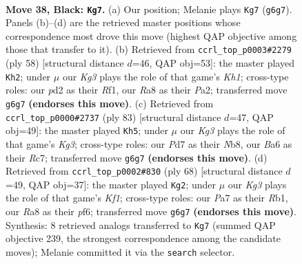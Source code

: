 \documentclass[11pt]{article}
\begin{document}
\clearpage

\begin{figure}[p]\centering
\begin{subfigure}{0.46\textwidth}\centering
\resizebox{\linewidth}{!}{%
\newchessgame
\chessboard[
  setfen={r7/p2p4/bppn2k1/5p1p/BPP2P2/N7/P2P3P/2R1K3 b - - 1 38},
  showmover=false,
  pgfstyle=straightmove, color=movearrow, markmove={g6-g7}
]}
\caption{}
\end{subfigure}\hfill
\begin{subfigure}{0.46\textwidth}\centering
\resizebox{\linewidth}{!}{%
\newchessgame
\chessboard[
  setfen={r5k1/ppp5/3pN1pp/3Pn3/2P1B2b/7P/PP4P1/5R1K w - - 3 30},
  showmover=false,
  pgfstyle=straightmove, color=movearrow, markmove={h1-h2}
]}
\caption{}
\end{subfigure}
\\[4pt]
\begin{subfigure}{0.46\textwidth}\centering
\resizebox{\linewidth}{!}{%
\newchessgame
\chessboard[
  setfen={1n6/1pr5/p3pbkp/P1P2p2/1N3P2/1R2B3/1P2K1P1/8 b - - 2 42},
  showmover=false,
  pgfstyle=straightmove, color=movearrow, markmove={g6-h5}
]}
\caption{}
\end{subfigure}\hfill
\begin{subfigure}{0.46\textwidth}\centering
\resizebox{\linewidth}{!}{%
\newchessgame
\chessboard[
  setfen={3r2k1/6p1/p4pp1/Pp6/1bn2B1P/1N4P1/1P2PP2/1R3K2 w - - 0 35},
  showmover=false,
  pgfstyle=straightmove, color=movearrow, markmove={f1-g2}
]}
\caption{}
\end{subfigure}
\caption{\textbf{Move 38, Black: \texttt{Kg7}.} (a) Our position; Melanie plays \texttt{Kg7} (\texttt{g6g7}). Panels (b)--(d) are the retrieved master positions whose correspondence most drove this move (highest QAP objective among those that transfer to it). (b) Retrieved from \texttt{ccrl\_top\_p0003\#2279} (ply 58) [structural distance $d$=46, QAP obj=53]: the master played \texttt{Kh2}; under $\mu$ our \emph{Kg3} plays the role of that game's \emph{Kh1}; cross-type roles: our \emph{p}d2 as their \emph{R}f1, our \emph{R}a8 as their \emph{P}a2; transferred move \texttt{g6g7} \textbf{(endorses this move)}. (c) Retrieved from \texttt{ccrl\_top\_p0000\#2737} (ply 83) [structural distance $d$=47, QAP obj=49]: the master played \texttt{Kh5}; under $\mu$ our \emph{Kg3} plays the role of that game's \emph{Kg3}; cross-type roles: our \emph{P}d7 as their \emph{N}b8, our \emph{B}a6 as their \emph{R}c7; transferred move \texttt{g6g7} \textbf{(endorses this move)}. (d) Retrieved from \texttt{ccrl\_top\_p0002\#830} (ply 68) [structural distance $d$=49, QAP obj=37]: the master played \texttt{Kg2}; under $\mu$ our \emph{Kg3} plays the role of that game's \emph{Kf1}; cross-type roles: our \emph{P}a7 as their \emph{R}b1, our \emph{R}a8 as their \emph{p}f6; transferred move \texttt{g6g7} \textbf{(endorses this move)}. Synthesis: 8 retrieved analogs transferred to \texttt{Kg7} (summed QAP objective 239, the strongest correspondence among the candidate moves); Melanie committed it via the \texttt{search} selector.}
\label{fig:thought-m75}
\end{figure}
\end{document}
